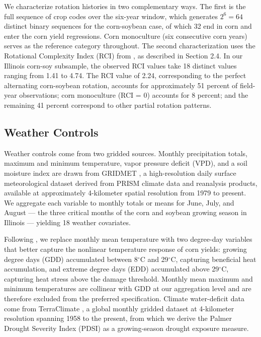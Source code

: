 \documentclass[11pt,letterpaper]{article}
\theoremstyle{remark}
\theoremstyle{plain}
\theoremstyle{definition}
\begin{document}
We characterize rotation histories in two complementary ways. The first is the full sequence of crop codes over the six-year window, which generates $2^{6}=64$ distinct binary sequences for the corn-soybean case, of which 32 end in corn and enter the corn yield regressions. Corn monoculture (six consecutive corn years) serves as the reference category throughout. The second characterization uses the Rotational Complexity Index (RCI) from \citep{socolar2021}, as described in Section 2.4. In our Illinois corn-soy subsample, the observed RCI values take 18 distinct values ranging from 1.41 to 4.74. The RCI value of 2.24, corresponding to the perfect alternating corn-soybean rotation, accounts for approximately 51 percent of field-year observations; corn monoculture (RCI = 0) accounts for 8 percent; and the remaining 41 percent correspond to other partial rotation patterns.

\subsection{\label{subsec:w_controls}Weather Controls}
Weather controls come from two gridded sources. Monthly precipitation totals, maximum and minimum temperature, vapor pressure deficit (VPD), and a soil moisture index are drawn from GRIDMET \citep{Abatzoglou2013}, a high-resolution daily surface meteorological dataset derived from PRISM climate data and reanalysis products, available at approximately 4-kilometer spatial resolution from 1979 to present. We aggregate each variable to monthly totals or means for June, July, and August — the three critical months of the corn and soybean growing season in Illinois — yielding 18 weather covariates.

Following \cite{SchlenkerRoberts2009}, we replace monthly mean temperature with two degree-day variables that better capture the nonlinear temperature response of corn yields: growing degree days (GDD) accumulated between 8$^{\circ}$C and 29$^{\circ}$C, capturing beneficial heat accumulation, and extreme degree days (EDD) accumulated above 29$^{\circ}$C, capturing heat stress above the damage threshold. Monthly mean maximum and minimum temperatures are collinear with GDD at our aggregation level and are therefore excluded from the preferred specification. Climate water-deficit data come from TerraClimate \citep{Abatzoglou2018}, a global monthly gridded dataset at 4-kilometer resolution spanning 1958 to the present, from which we derive the Palmer Drought Severity Index (PDSI) as a growing-season drought exposure measure.
\end{document}
